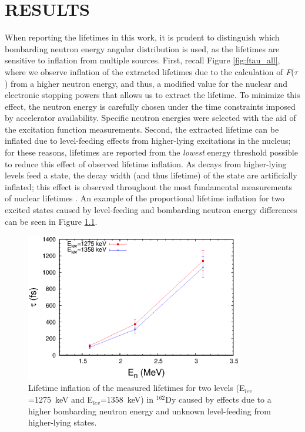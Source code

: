 \chapter{RESULTS}\label{sec:lifetime_inflation}
When reporting the lifetimes in this work, it is prudent to distinguish which bombarding neutron energy angular distribution is used, as the lifetimes are sensitive to inflation from multiple sources. First, recall Figure \ref{fig:ftau_all}, where we observe inflation of the extracted lifetimes due to the calculation of \textit{F}($\tau$) from a higher neutron energy, and thus, a modified value for the nuclear and electronic stopping powers that allows us to extract the lifetime. To minimize this effect, the neutron energy is carefully chosen under the time constraints imposed by accelerator availability. Specific neutron energies were selected with the aid of the excitation function measurements. Second, the extracted lifetime can be inflated due to level-feeding effects from higher-lying excitations in the nucleus; for these reasons, lifetimes are reported from the \textit{lowest} energy threshold possible to reduce this effect of observed lifetime inflation. As decays from higher-lying levels feed a state, the decay width (and thus lifetime) of the state are artificially inflated; this effect is observed throughout the most fundamental measurements of nuclear lifetimes \cite{Casten_text,Wong_text}. An example of the proportional lifetime inflation for two excited states caused by level-feeding and bombarding neutron energy differences can be seen in Figure \ref{fig:lifetime_inflation}. 

\begin{figure}[h!]
\begin{center}
\includegraphics[width=0.85\textwidth]{figures/lifetime_inflation_example.eps}
\caption{Lifetime inflation of the measured lifetimes for two levels (E$_{lev}$=1275~keV and E$_{lev}$=1358~keV) in $^{162}$Dy caused by effects due to a higher bombarding neutron energy and unknown level-feeding from higher-lying states. \label{fig:lifetime_inflation}}
\end{center}
\end{figure}

